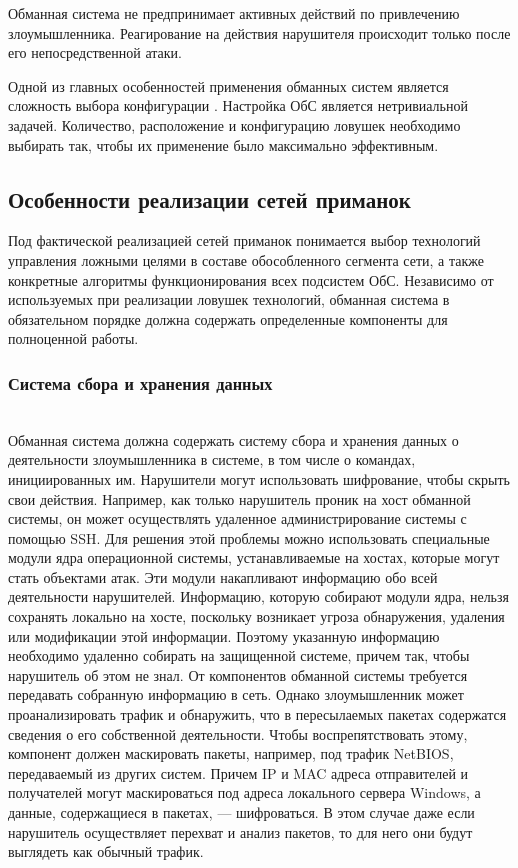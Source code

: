 Обманная система не предпринимает активных действий по привлечению злоумышленника. Реагирование на действия нарушителя происходит только после его непосредственной атаки.

Одной из главных особенностей применения обманных систем является сложность выбора конфигурации \citep{rajan}. Настройка ОбС является нетривиальной задачей. Количество, расположение и конфигурацию ловушек необходимо выбирать так, чтобы их применение было максимально эффективным.

\subsection{Особенности реализации сетей приманок}

Под фактической реализацией сетей приманок понимается выбор технологий управления ложными целями в составе обособленного сегмента сети, а также конкретные алгоритмы функционирования всех подсистем ОбС.  Независимо от используемых при реализации ловушек технологий, обманная система в обязательном порядке должна содержать определенные  компоненты для полноценной работы.

\subsubsection{Система сбора и хранения данных}\hspace*{\fill} \\

Обманная система должна содержать систему сбора и хранения данных о деятельности злоумышленника в системе, в том числе о командах, инициированных им. Нарушители могут использовать шифрование, чтобы скрыть свои действия. Например, как только нарушитель проник на хост обманной системы, он может осуществлять удаленное администрирование системы с помощью SSH. Для решения этой проблемы можно использовать специальные модули ядра операционной системы, устанавливаемые на хостах, которые могут стать объектами атак. Эти модули накапливают информацию обо всей деятельности нарушителей. Информацию, которую собирают модули ядра, нельзя сохранять локально на хосте, поскольку возникает угроза обнаружения, удаления или модификации этой информации. Поэтому указанную информацию необходимо удаленно собирать на защищенной системе, причем так, чтобы нарушитель об этом не знал. От компонентов обманной системы требуется передавать собранную информацию в сеть. Однако злоумышленник может проанализировать трафик и обнаружить, что в пересылаемых пакетах содержатся сведения о его собственной деятельности. Чтобы воспрепятствовать этому, компонент должен маскировать пакеты, например, под трафик NetBIOS, передаваемый из других систем. Причем IP и MAC адреса отправителей и получателей могут маскироваться под адреса локального сервера Windows, а данные, содержащиеся в пакетах, — шифроваться. В этом случае даже если нарушитель осуществляет перехват и анализ пакетов, то для него они будут выглядеть как обычный трафик.

